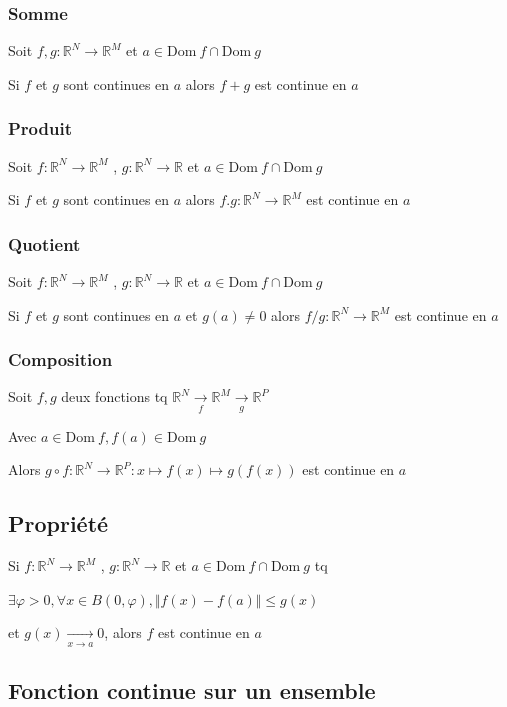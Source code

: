 \documentclass[a4paper,10pt]{article}
\newcommand{\ap}{\rightarrow}
\newcommand{\Dom}{\mathrm{Dom}\:}
\newcommand{\R}{\mathbb{R}}
\newcommand{\conv}[1]{\mathop{\longrightarrow}\limits_{#1}}
\begin{document}
\subsubsection{Somme}

Soit $f,g : \R^N \ap \R^M$ et $a \in \Dom f \cap \Dom g$

Si $f$ et $g$ sont continues en $a$ alors $f+g$ est continue en $a$

\subsubsection{Produit}

Soit $f : \R^N \ap \R^M$ , $g : \R^N \ap \R$ et $a \in \Dom f \cap \Dom g$

Si $f$ et $g$ sont continues en $a$ alors $f.g : \R^N \ap \R^M$ est continue en $a$

\subsubsection{Quotient}

Soit $f : \R^N \ap \R^M$ , $g : \R^N \ap \R$ et $a \in \Dom f \cap \Dom g$

Si $f$ et $g$ sont continues en $a$ et $g(a) \neq 0$ alors $f/g : \R^N \ap \R^M$ est continue en $a$

\subsubsection{Composition}

Soit $f,g$ deux fonctions tq $\R^N \conv{f} \R^M \conv{g} \R^P$

Avec $a \in \Dom f, f(a) \in \Dom g$

Alors $g \circ f : \R^N \ap \R^P : x \mapsto f(x) \mapsto g(f(x))$ est continue en $a$

\subsection{Propriété}


Si $f : \R^N \ap \R^M$ , $g : \R^N \ap \R$ et $a \in \Dom f \cap \Dom g$ tq

$\exists \varphi > 0, \forall x \in B(0,\varphi), \Vert f(x) - f(a) \Vert \leq g(x)$

et $g(x) \conv{x \ap a} 0$, alors $f$ est continue en $a$

\subsection{Fonction continue sur un ensemble}
\end{document}

